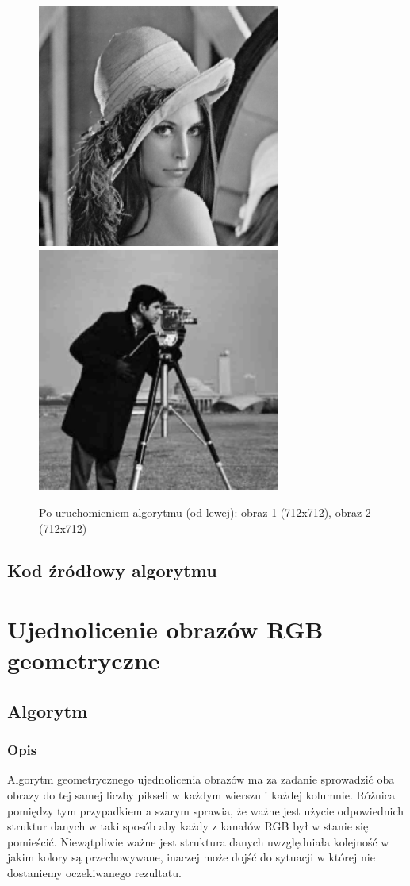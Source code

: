 \documentclass[a4paper,12pt]{book}
\begin{document}
\begin{figure}[H]
	\caption{Po uruchomieniem algorytmu (od lewej): obraz 1 (712x712), obraz 2 (712x712)}
	\includegraphics[width=8cm, height=8cm]{1-2/raster-gray-lena-photoman.png}
	\includegraphics[width=8cm, height=8cm]{1-2/raster-gray-photoman-lena.png}
\end{figure}

\subsection*{Kod źródłowy algorytmu}

\section{Ujednolicenie obrazów RGB geometryczne}
\subsection*{Algorytm}
\subsubsection*{Opis}
Algorytm geometrycznego ujednolicenia obrazów ma za zadanie sprowadzić oba obrazy do tej samej liczby pikseli w każdym wierszu i każdej kolumnie. 
Różnica pomiędzy tym przypadkiem a szarym sprawia, że ważne jest użycie odpowiednich struktur danych w taki sposób aby każdy z kanałów RGB był w stanie się pomieścić. Niewątpliwie ważne jest struktura danych uwzględniała kolejność w jakim kolory są przechowywane, inaczej może dojść do sytuacji w której nie dostaniemy oczekiwanego rezultatu. 
\end{document}
